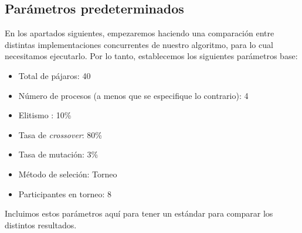 \documentclass[twocolumn,spanish]{revtex4-1}
\begin{document}
\subsection{Parámetros predeterminados}
En los apartados siguientes, empezaremos haciendo una comparación entre distintas implementaciones concurrentes de nuestro algoritmo, para lo cual necesitamos ejecutarlo. Por lo tanto, establecemos los siguientes parámetros base:
\begin{itemize}
    \item Total de pájaros: 40
    \item Número de procesos (a menos que se especifique lo contrario): 4
    \item Elitismo : 10\%
    \item Tasa de \textit{crossover}: 80\%
    \item Tasa de mutación: 3\%
    \item Método de seleción: Torneo
    \item Participantes en torneo: 8
\end{itemize}

Incluimos estos parámetros aquí para tener un estándar para comparar los distintos resultados. 
\end{document}
